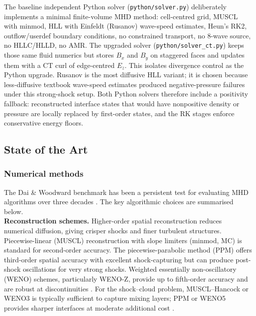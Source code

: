 \documentclass[11pt,a4paper]{article}
\begin{document}
The baseline independent Python solver (\texttt{python/solver.py}) deliberately implements a minimal finite-volume MHD method: cell-centred grid, MUSCL with minmod, HLL with Einfeldt (Rusanov) wave-speed estimates, Heun's RK2, outflow/userdef boundary conditions, no constrained transport, no 8-wave source, no HLLC/HLLD, no AMR. The upgraded solver (\texttt{python/solver\_ct.py}) keeps those same fluid numerics but stores $B_x$ and $B_y$ on staggered faces and updates them with a CT curl of edge-centred $E_z$. This isolates divergence control as the Python upgrade. Rusanov is the most diffusive HLL variant; it is chosen because less-diffusive textbook wave-speed estimates produced negative-pressure failures under this strong-shock setup. Both Python solvers therefore include a positivity fallback: reconstructed interface states that would have nonpositive density or pressure are locally replaced by first-order states, and the RK stages enforce conservative energy floors.

\subsection{State of the Art}

\subsubsection{Numerical methods}

The Dai \& Woodward benchmark has been a persistent test for evaluating MHD algorithms over three decades \cite{dai1994, shin2008, mignone2007}. The key algorithmic choices are summarised below.
\\

\textbf{Reconstruction schemes.} Higher-order spatial reconstruction reduces numerical diffusion, giving crisper shocks and finer turbulent structures. Piecewise-linear (MUSCL) reconstruction with slope limiters (minmod, MC) is standard for second-order accuracy. The piecewise-parabolic method (PPM) offers third-order spatial accuracy with excellent shock-capturing \cite{colella1984} but can produce post-shock oscillations for very strong shocks. Weighted essentially non-oscillatory (WENO) schemes, particularly WENO-Z, provide up to fifth-order accuracy and are robust at discontinuities \cite{borges2008}. For the shock--cloud problem, MUSCL--Hancock or WENO3 is typically sufficient to capture mixing layers; PPM or WENO5 provides sharper interfaces at moderate additional cost \cite{mignone2007}.
\\
\end{document}
